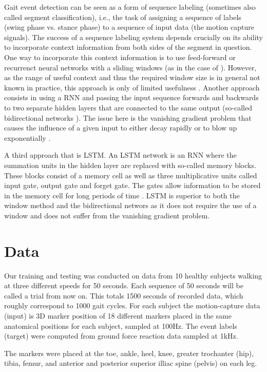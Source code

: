 \documentclass{acm_proc_article-sp}
\begin{document}
Gait event detection can be seen as a form of sequence labeling (sometimes also
called segment classification), i.e., the task of assigning a sequence of labels
(swing phase vs. stance phase) to a sequence of input data (the motion capture
signals).
The success of a sequence labeling system depends crucially on its ability to
incorporate context information from both sides of the segment in question.
%
One way to incorporate this context information is to use feed-forward or
recurrenct neural networks with a sliding windows (as in the case of
\cite{Miller2009}).
However, as the range of useful context and thus the required window size is in
general not known in practice, this approach is only of limited usefulness
\cite{Graves2012}.
%
Another approach consists in using a RNN and passing the
input sequence forwards and backwards to two separate hidden layers that are
connected to the same output (so-called bidirectional networks
\cite{Schuster1999}).
The issue here is the vanishing gradient problem that causes the influence of a
given input to either decay rapidly or to blow up exponentially
\cite{Hochreiter1991}.

A third approach that is LSTM.
An LSTM network is an RNN where the summation units in the hidden layer are 
replaced with so-called memory blocks.
These blocks consist of a memory cell as well as three multiplicative units 
called input gate, output gate and forget gate.
The gates allow information to be stored in the memory cell for long periods 
of time
\cite{Graves2012}.
LSTM is superior to both the window method and the bidirectional networs as it
does not require the use of a window and does not suffer from the vanishing
gradient problem.

\section{Data}
\label{sec:Data}
Our training and testing was conducted on data from 10 healthy subjects walking at three different speeds for 50 seconds. Each sequence of 50 seconds will be called a trial from now on. This totals 1500 seconds of recorded data, which roughly correspond to 1000 gait cycles.  For each subject the motion-capture data (input) is 3D marker position of 18 different markers placed in the same anatomical positions for each subject, sampled at 100Hz. The event labels (target) were computed from ground force reaction data sampled at 1kHz.

The markers were placed at the toe, ankle, heel, knee, greater trochanter (hip), tibia, femur, and anterior and posterior superior illiac spine (pelvis) on each leg.
\end{document}
